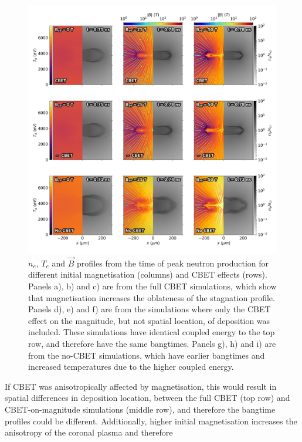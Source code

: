 \begin{figure}[t!]
    \includegraphics[width=\linewidth]{Results2/Images/allall_stagnation.png}
    \centering
    \caption{$n_e$, $T_e$ and $\vec{B}$ profiles from the time of peak neutron production for different initial magnetisation (columns) and \ac{CBET} effects (rows).
    Panels a), b) and c) are from the full \ac{CBET} simulations, which show that magnetisation increases the oblateness of the stagnation profile.
    Panels d), e) and f) are from the simulations where only the \ac{CBET} effect on the magnitude, but not spatial location, of deposition was included.
    These simulations have identical coupled energy to the top row, and therefore have the same bangtimes.
    Panels g), h) and i) are from the no-\ac{CBET} simulations, which have earlier bangtimes and increased temperatures due to the higher coupled energy.}%
    \label{fig:Res2_allall_stagnation}
\end{figure}

If \ac{CBET} was anisotropically affected by magnetisation, this would result in spatial differences in deposition location, between the full \ac{CBET} (top row) and \ac{CBET}-on-magnitude simulations (middle row), and therefore the bangtime profiles could be different.
Additionally, higher initial magnetisation increases the anisotropy of the coronal plasma and therefore 

